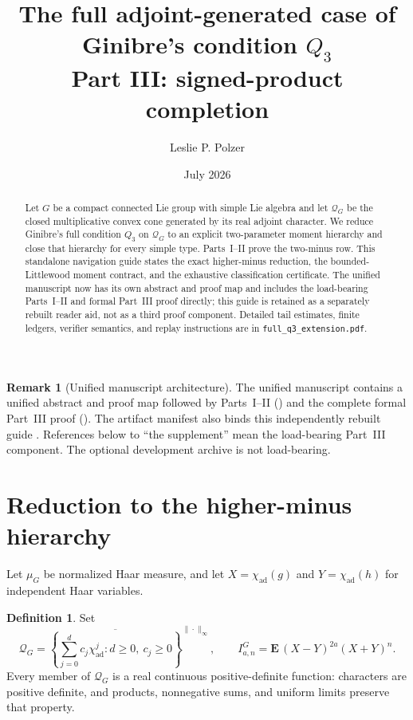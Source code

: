 \documentclass[10pt,reqno]{amsart}
\title[Adjoint-generated Ginibre $Q_3$: Part III]
{The full adjoint-generated case of Ginibre's condition
\texorpdfstring{$Q_3$}{Q3}\\
\large Part III: signed-product completion}
\author{Leslie P. Polzer}
\date{July 2026}
\theoremstyle{definition}
\newtheorem{definition}[theorem]{Definition}
\newtheorem{remark}[theorem]{Remark}
\newcommand{\chiad}{\chi_{\mathrm{ad}}}
\newcommand{\Qcone}{\mathcal Q}
\begin{document}
\begin{abstract}
Let $G$ be a compact connected Lie group with simple Lie algebra and let
$\Qcone_G$ be the closed multiplicative convex cone generated by its real
adjoint character.  We reduce Ginibre's full condition $Q_3$ on $\Qcone_G$
to an explicit two-parameter moment hierarchy and close that hierarchy for
every simple type.  Parts~I--II prove the two-minus row.  This standalone
navigation guide states the exact higher-minus reduction, the
bounded-Littlewood moment contract, and the exhaustive classification
certificate.  The unified manuscript now has its own abstract and proof map
and includes the load-bearing Parts~I--II and formal Part~III proof directly;
this guide is retained as a separately rebuilt reader aid, not as a third
proof component.  Detailed tail estimates, finite ledgers, verifier semantics,
and replay instructions are in \texttt{full\_q3\_extension.pdf}.
\end{abstract}

\maketitle

\begin{remark}[Unified manuscript architecture]
\label{rem:architecture}
The unified manuscript  contains a unified abstract and
proof map followed by Parts~I--II () and the complete formal
Part~III proof ().  The artifact manifest
 also binds this independently rebuilt
guide .  References below to ``the supplement'' mean
the load-bearing Part~III component.
The optional  development archive is not load-bearing.
\end{remark}

\section{Reduction to the higher-minus hierarchy}

Let $\mu_G$ be normalized Haar measure, and let
$X=\chiad(g)$ and $Y=\chiad(h)$ for independent Haar variables.

\begin{definition}
Set
\[
 \Qcone_G=\overline{\left\{\sum_{j=0}^{d}c_j\chiad^j:
 d\geq0,\ c_j\geq0\right\}}^{\|\cdot\|_\infty},
 \qquad
 I^G_{a,n}=\mathbf E\,(X-Y)^{2a}(X+Y)^n.
\]
Every member of $\Qcone_G$ is a real continuous positive-definite function:
characters are positive definite, and products, nonnegative sums, and
uniform limits preserve that property.
\end{definition}
\end{document}

